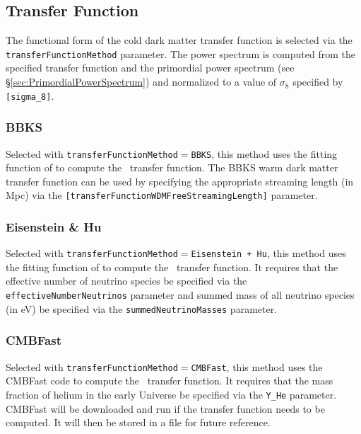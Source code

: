 \subsection{Transfer Function}\label{sec:TransferFunction}

The functional form of the cold dark matter transfer function is selected via the {\tt transferFunctionMethod} parameter. The power spectrum is computed from the specified transfer function and the primordial power spectrum (see \S\ref{sec:PrimordialPowerSpectrum}) and normalized to a value of $\sigma_8$ specified by {\tt [sigma\_8]}.

\subsubsection{BBKS}

Selected with {\tt transferFunctionMethod}$=${\tt BBKS}, this method uses the fitting function of \cite{bardeen_statistics_1986} to compute the \CDM\ transfer function. The BBKS warm dark matter transfer function can be used by specifying the appropriate streaming length (in Mpc) via the {\tt [transferFunctionWDMFreeStreamingLength]} parameter.

\subsubsection{Eisenstein \& Hu}

Selected with {\tt transferFunctionMethod}$=${\tt Eisenstein + Hu}, this method uses the fitting function of \cite{eisenstein_power_1999} to compute the \CDM\ transfer function. It requires that the effective number of neutrino species be specified via the {\tt effectiveNumberNeutrinos} parameter and summed mass of all neutrino species (in eV) be specified via the {\tt summedNeutrinoMasses} parameter.

\subsubsection{{\sc CMBFast}}

Selected with {\tt transferFunctionMethod}$=${\tt CMBFast}, this method uses the {\sc CMBFast} code to compute the \CDM\ transfer function. It requires that the mass fraction of helium in the early Universe be specified via the {\tt Y\_He} parameter. {\sc CMBFast} will be downloaded and run if the transfer function needs to be computed. It will then be stored in a file for future reference.

